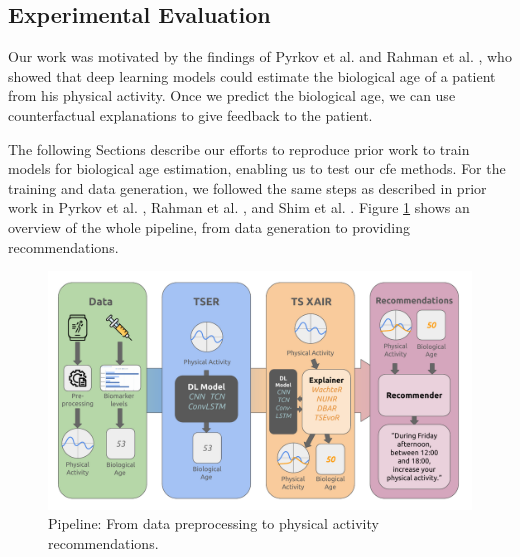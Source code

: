 \subsection{Experimental Evaluation}
\label{sec:methods:experiments}
Our work was motivated by the findings of Pyrkov et al. \cite{pyrkov_extracting_2018} and Rahman et al. \cite{rahman_deep_2019}, who showed that deep learning models could estimate the biological age of a patient from his physical activity. Once we predict the biological age, we can use counterfactual explanations to give feedback to the patient.

The following Sections describe our efforts to reproduce prior work to train models for biological age estimation, enabling us to test our \acrshort{cfe} methods. For the training and data generation, we followed the same steps as described in prior work in Pyrkov et al. \cite{pyrkov_extracting_2018}, Rahman et al. \cite{rahman_deep_2019}, and Shim et al. \cite{shim_wearable-based_2023}. Figure \ref{fig:pipeline} shows an overview of the whole pipeline, from data generation to providing recommendations.

\begin{figure}
    \centering
    \includegraphics[width=1\linewidth]{images/pipeline.pdf}
    \caption{Pipeline: From data preprocessing to physical activity recommendations.}
    \label{fig:pipeline}
\end{figure}


